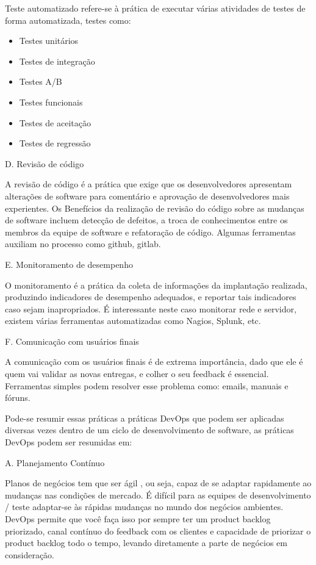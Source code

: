 \documentclass[12pt]{article}
\begin{document}
Teste automatizado refere-se à prática de executar várias atividades de testes de forma automatizada, testes como:

\begin{itemize}
	\item Testes unitários
    \item Testes de integração
    \item Testes A/B
	\item Testes funcionais
    \item Testes de aceitação
    \item Testes de regressão
\end{itemize}

D. Revisão de código

A revisão de código é a prática que exige que os desenvolvedores apresentam alterações de software para comentário e aprovação de desenvolvedores mais experientes. Os Benefícios da realização de revisão do código sobre as mudanças de software incluem detecção de defeitos, a troca de conhecimentos entre
os membros da equipe de software e refatoração de código. Algumas ferramentas auxiliam no processo como github, gitlab.


E. Monitoramento de desempenho

O monitoramento é a prática da coleta de informações da implantação realizada, produzindo indicadores de desempenho adequados, e reportar tais indicadores caso sejam inapropriados. É interessante neste caso monitorar rede e servidor, existem várias ferramentas automatizadas como Nagios, Splunk, etc.

F. Comunicação com usuários finais
	
A comunicação com os usuários finais é de extrema importância, dado que ele é quem vai validar as novas entregas, e colher o seu feedback é essencial. Ferramentas simples podem resolver esse problema como: emails, manuais e fóruns.


Pode-se resumir essas práticas a práticas DevOps que podem ser aplicadas diversas vezes dentro de um ciclo de desenvolvimento de software, as práticas DevOps podem ser resumidas em:

A. Planejamento Contínuo

Planos de negócios tem que ser ágil , ou seja, capaz de se adaptar rapidamente ao
mudanças nas condições de mercado.  É difícil para as equipes de desenvolvimento / teste
adaptar-se às rápidas mudanças no mundo dos negócios
ambientes. DevOps permite que você faça isso por
sempre ter um product backlog priorizado,
canal contínuo do feedback com os clientes
e capacidade de priorizar o product backlog todo o
tempo, levando diretamente a parte de negócios em
consideração.
\end{document}
